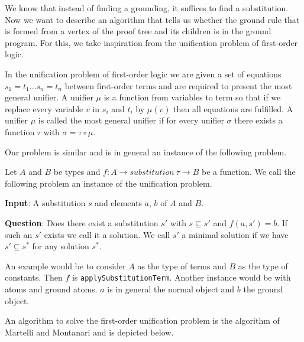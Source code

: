 We know that instead of finding a grounding, it suffices to find a substitution. Now we want to describe an algorithm that tells us whether the ground rule that is formed from a vertex of the proof tree and its children is in the ground program. For this, we take inspiration from the unification problem of first-order logic.

In the unification problem of first-order logic we are given a set of equations $s_1 = t_1 \dots s_n = t_n$ between first-order terms and are required to present the most general unifier. A unifier $\mu$ is a function from variables to term so that if we replace every variable $v$ in $s_i$ and $t_i$ by $\mu (v)$ then all equations are fulfilled. A unifier $\mu$ is called the most general unifier if for every unifier $\sigma$ there exists a function $\tau$ with $\sigma = \tau \circ \mu$.

Our problem is similar and is in general an instance of the following problem.

\begin{definition}
    Let $A$ and $B$ be types and $f: A \to substitution\ \tau \to B$ be a function. We call the following problem an instance of the unification problem.

    \textbf{Input}: A substitution $s$ and elements $a$, $b$ of $A$ and $B$.

    \textbf{Question}: Does there exist a substitution $s'$ with $s \subseteq s'$ and $f(a, s') = b$. If such an $s'$ exists we call it a solution. We call $s'$ a minimal solution if we have $s' \subseteq s^\ast$ for any solution $s^\ast$.
\end{definition}

An example would be to consider $A$ as the type of terms and $B$ as the type of constants. Then $f$ is \lstinline|applySubstitutionTerm|. Another instance would be with atoms and ground atoms. $a$ is in general the normal object and $b$ the ground object.

An algorithm to solve the first-order unification problem is the algorithm of Martelli and Montanari \cite{MartMont} and is depicted below.


